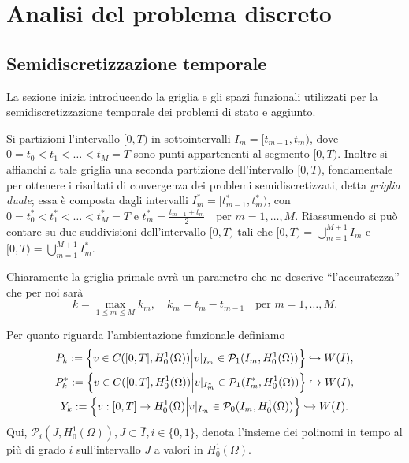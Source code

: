 \section{Analisi del problema discreto}
\label{chap:Discontinuos}

\subsection{Semidiscretizzazione temporale}
La sezione inizia introducendo la griglia e gli spazi funzionali utilizzati per la semidiscretizzazione temporale dei problemi di stato e aggiunto.

Si partizioni l'intervallo $[0,T)$ in sottointervalli $I_m=[t_{m-1},t_m)$, dove $0=t_0<t_1<\dots<t_M=T$ sono punti appartenenti al segmento $[0,T)$. Inoltre si affianchi a tale griglia una seconda partizione dell'intervallo $[0,T)$, fondamentale per ottenere i risultati di convergenza dei problemi semidiscretizzati, detta \textit{griglia duale}; essa è composta dagli intervalli $I^*_m=[t^*_{m-1},t^*_m)$, con $0=t^*_0<t^*_1<\dots<t^*_M=T$ e $t^*_m=\frac{t_{m-1}+t_m}{2}\quad\text{per $m=1,\dots,M$}$. Riassumendo si può contare su due suddivisioni dell'intervallo $[0,T)$ tali che $[0,T)=\bigcup^{M+1}_{m=1} I_m$ e $[0,T)=\bigcup^{M+1}_{m=1} I^*_m$.

Chiaramente la griglia primale avrà un parametro che ne descrive ``l'accuratezza'' che per noi sarà 
\[
k=\max_{1\le m\le M} k_m,\quad k_m=t_m-t_{m-1}\quad\text{per $m=1,\dots,M$}.
\] 

Per quanto riguarda l'ambientazione funzionale definiamo 
\begin{gather*}
P_k:=\Bigl\{v\in C([0,T],H^1_0(\Omega))\Bigl| v|_{I_{m}}\in \mathcal{P}_1(I_m,H^1_0(\Omega))\Bigr\}\hookrightarrow W(I),\\
P^*_k:=\Bigl\{v\in C([0,T],H^1_0(\Omega))\Bigl| v|_{I^*_{m}}\in \mathcal{P}_1(I^*_m,H^1_0(\Omega))\Bigr\}\hookrightarrow W(I),\\  
  Y_k:=\Bigl\{v:[0,T]\to H^1_0(\Omega)\Bigl| v|_{I_{m}}\in \mathcal{P}_0(I_m,H^1_0(\Omega))\Bigr\}\hookrightarrow W(I).
\end{gather*}
Qui, $\mathcal{P}_i(J,H^1_0(\Omega)), J\subset \overset{-}{I}, i\in\{0,1\}$, denota l'insieme dei polinomi in tempo al più di grado $i$ sull'intervallo $J$ a valori in $H^1_0(\Omega)$.


